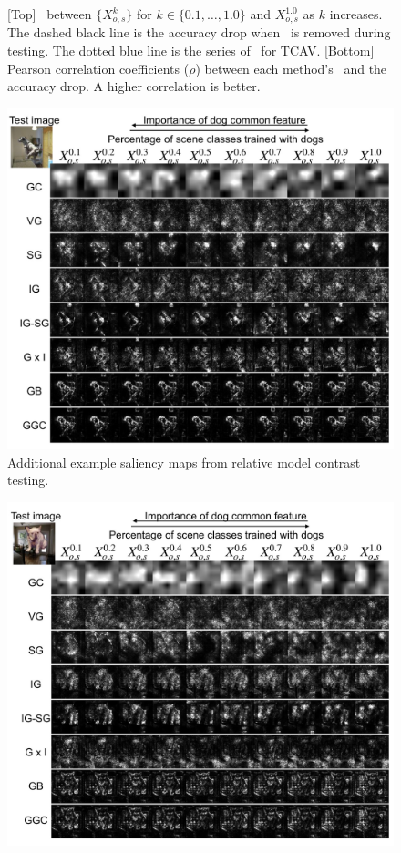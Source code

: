 \begin{appendix}
\begin{figure}
  \caption{[Top] \MCS~between $\{X_{o,s}^k\}$ for $k \in \{0.1, \dots, 1.0\}$ and $X_{o,s}^{1.0}$ as $k$ increases. The dashed black line is the accuracy drop when \CF~is removed during testing. The dotted blue line is the series of \MCS~for TCAV. [Bottom] Pearson correlation coefficients ($\rho$) between each method's \MCS~and the accuracy drop. A higher correlation is better.}
\end{figure}

\clearpage

\begin{figure}[!]
  \includegraphics[width=1.\linewidth]{figures/rmc_demo28.jpg}
    \caption{Additional example saliency maps from relative model contrast testing.}
\end{figure}
\begin{figure}
  \includegraphics[width=1.\linewidth]{figures/rmc_demo58.jpg}

\end{figure}
\end{appendix}
